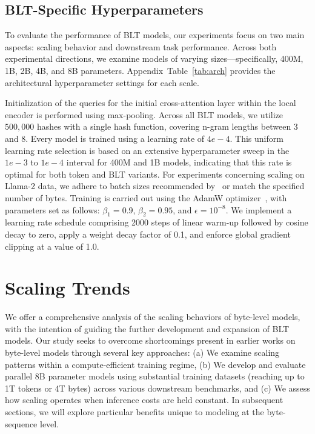 \subsection{{\textsc BLT}-Specific Hyperparameters} To evaluate the performance of {\textsc BLT} models, our experiments focus on two main aspects: scaling behavior and downstream task performance. Across both experimental directions, we examine models of varying sizes—specifically, 400M, 1B, 2B, 4B, and 8B parameters. Appendix~Table~\ref{tab:arch} provides the architectural hyperparameter settings for each scale.

Initialization of the queries for the initial cross-attention layer within the local encoder is performed using max-pooling. Across all {\textsc BLT} models, we utilize $500,000$ hashes with a single hash function, covering n-gram lengths between 3 and 8. Every model is trained using a learning rate of $4e-4$. This uniform learning rate selection is based on an extensive hyperparameter sweep in the $1e-3$ to $1e-4$ interval for 400M and 1B models, indicating that this rate is optimal for both token and {\textsc BLT} variants. For experiments concerning scaling on Llama-2 data, we adhere to batch sizes recommended by~\cite{dubey2024llama} or match the specified number of bytes. Training is carried out using the AdamW optimizer~\citep{adamw}, with parameters set as follows: $\beta_1=0.9$, $\beta_2=0.95$, and $\epsilon=10^{-8}$. We implement a learning rate schedule comprising 2000 steps of linear warm-up followed by cosine decay to zero, apply a weight decay factor of 0.1, and enforce global gradient clipping at a value of 1.0.

\section{Scaling Trends}
\label{section:scaling}

We offer a comprehensive analysis of the scaling behaviors of byte-level models, with the intention of guiding the further development and expansion of {\textsc BLT} models. Our study seeks to overcome shortcomings present in earlier works on byte-level models through several key approaches: (a) We examine scaling patterns within a compute-efficient training regime, (b) We develop and evaluate parallel 8B parameter models using substantial training datasets (reaching up to 1T tokens or 4T bytes) across various downstream benchmarks, and (c) We assess how scaling operates when inference costs are held constant. In subsequent sections, we will explore particular benefits unique to modeling at the byte-sequence level.

